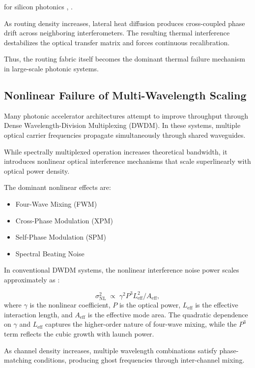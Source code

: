 \documentclass[journal]{IEEEtran}
\begin{document}
for silicon photonics \cite{Saleh2019}, \cite{Incropera2006}.

As routing density increases, lateral heat diffusion produces cross-coupled phase drift across neighboring interferometers. The resulting thermal interference destabilizes the optical transfer matrix and forces continuous recalibration.

Thus, the routing fabric itself becomes the dominant thermal failure mechanism in large-scale photonic systems.

\subsection{\textbf{Nonlinear Failure of Multi-Wavelength Scaling}}

Many photonic accelerator architectures attempt to improve throughput through Dense Wavelength-Division Multiplexing (DWDM). In these systems, multiple optical carrier frequencies propagate simultaneously through shared waveguides.

While spectrally multiplexed operation increases theoretical bandwidth, it introduces nonlinear optical interference mechanisms that scale superlinearly with optical power density.

The dominant nonlinear effects are:

\begin{itemize}
\item Four-Wave Mixing (FWM)
\item Cross-Phase Modulation (XPM)
\item Self-Phase Modulation (SPM)
\item Spectral Beating Noise
\end{itemize}

In conventional DWDM systems, the nonlinear interference noise power scales approximately as \cite{Boyd2020,Cotter1999}:

\begin{equation}
\sigma_{\mathrm{NL}}^2 \;\propto\; \gamma^2 P^3 L_{\mathrm{eff}}^2 / A_{\mathrm{eff}},
\label{eq:fwm_scaling}
\end{equation}
where $\gamma$ is the nonlinear coefficient, $P$ is the optical power, $L_{\mathrm{eff}}$ is the effective interaction length, and $A_{\mathrm{eff}}$ is the effective mode area. The quadratic dependence on $\gamma$ and $L_{\mathrm{eff}}$ captures the higher-order nature of four-wave mixing, while the $P^3$ term reflects the cubic growth with launch power.

As channel density increases, multiple wavelength combinations satisfy phase-matching conditions, producing ghost frequencies through inter-channel mixing.
\end{document}
